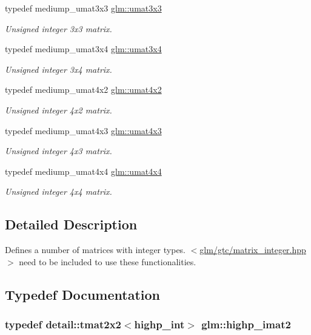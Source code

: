 \begin{DoxyCompactItemize}
typedef mediump\-\_\-umat3x3 \hyperlink{group__gtc__matrix__integer_gab80b6501ba1b2c40119a0f2d256f4c97}{glm\-::umat3x3}
\begin{DoxyCompactList}\small\item\em Unsigned integer 3x3 matrix. \end{DoxyCompactList}\item 
typedef mediump\-\_\-umat3x4 \hyperlink{group__gtc__matrix__integer_ga5410857d098a989a30b4017100bc2ff7}{glm\-::umat3x4}
\begin{DoxyCompactList}\small\item\em Unsigned integer 3x4 matrix. \end{DoxyCompactList}\item 
typedef mediump\-\_\-umat4x2 \hyperlink{group__gtc__matrix__integer_ga13e8392218e9b6e1b7f194a21b5c88bf}{glm\-::umat4x2}
\begin{DoxyCompactList}\small\item\em Unsigned integer 4x2 matrix. \end{DoxyCompactList}\item 
typedef mediump\-\_\-umat4x3 \hyperlink{group__gtc__matrix__integer_ga08373f5588a54da1a48e5e55c7d51004}{glm\-::umat4x3}
\begin{DoxyCompactList}\small\item\em Unsigned integer 4x3 matrix. \end{DoxyCompactList}\item 
typedef mediump\-\_\-umat4x4 \hyperlink{group__gtc__matrix__integer_gae0931b79e808fb0983848778a60eb548}{glm\-::umat4x4}
\begin{DoxyCompactList}\small\item\em Unsigned integer 4x4 matrix. \end{DoxyCompactList}\end{DoxyCompactItemize}


\subsection{Detailed Description}
Defines a number of matrices with integer types. $<$\hyperlink{matrix__integer_8hpp}{glm/gtc/matrix\-\_\-integer.\-hpp}$>$ need to be included to use these functionalities. 

\subsection{Typedef Documentation}
\hypertarget{group__gtc__matrix__integer_ga83bfb0be8d0a12b7c5e7c4af0eb9f828}{
\subsubsection[{highp\-\_\-imat2}]{\setlength{\rightskip}{0pt plus 5cm}typedef detail\-::tmat2x2$<$highp\-\_\-int$>$ {\bf glm\-::highp\-\_\-imat2}}}\label{group__gtc__matrix__integer_ga83bfb0be8d0a12b7c5e7c4af0eb9f828}


